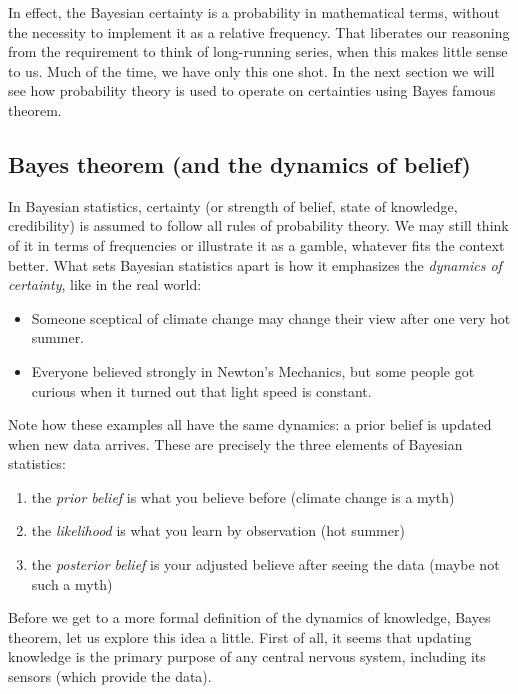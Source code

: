 \documentclass[]{svmono}
\providecommand{\tightlist}{%
  \setlength{\itemsep}{0pt}\setlength{\parskip}{0pt}}
\begin{document}
In effect, the Bayesian certainty is a probability in mathematical
terms, without the necessity to implement it as a relative frequency.
That liberates our reasoning from the requirement to think of
long-running series, when this makes little sense to us. Much of the
time, we have only this one shot. In the next section we will see how
probability theory is used to operate on certainties using Bayes famous
theorem.

\subsection{Bayes theorem (and the dynamics of
belief)}\label{bayes-theorem-and-the-dynamics-of-belief}

In Bayesian statistics, certainty (or strength of belief, state of
knowledge, credibility) is assumed to follow all rules of probability
theory. We may still think of it in terms of frequencies or illustrate
it as a gamble, whatever fits the context better. What sets Bayesian
statistics apart is how it emphasizes the \emph{dynamics of certainty},
like in the real world:

\begin{itemize}
\tightlist
\item
  Someone sceptical of climate change may change their view after one
  very hot summer.
\item
  Everyone believed strongly in Newton's Mechanics, but some people got
  curious when it turned out that light speed is constant.
\end{itemize}

Note how these examples all have the same dynamics: a prior belief is
updated when new data arrives. These are precisely the three elements of
Bayesian statistics:

\begin{enumerate}
\def\labelenumi{\arabic{enumi}.}
\tightlist
\item
  the \emph{prior belief} is what you believe before (climate change is
  a myth)
\item
  the \emph{likelihood} is what you learn by observation (hot summer)
\item
  the \emph{posterior belief} is your adjusted believe after seeing the
  data (maybe not such a myth)
\end{enumerate}

Before we get to a more formal definition of the dynamics of knowledge,
Bayes theorem, let us explore this idea a little. First of all, it seems
that updating knowledge is the primary purpose of any central nervous
system, including its sensors (which provide the data).
\end{document}
